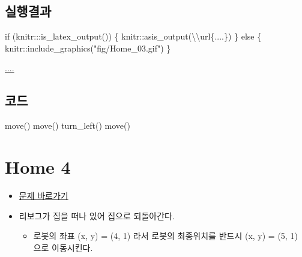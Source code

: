 \documentclass[
  b5paperpaper,
  DIV=11,
  numbers=noendperiod]{scrreprt}
\newenvironment{Shaded}{\begin{snugshade}}{\end{snugshade}}
\newcommand{\ControlFlowTok}[1]{\textcolor[rgb]{0.00,0.23,0.31}{#1}}
\newcommand{\FunctionTok}[1]{\textcolor[rgb]{0.28,0.35,0.67}{#1}}
\newcommand{\NormalTok}[1]{\textcolor[rgb]{0.00,0.23,0.31}{#1}}
\newcommand{\SpecialCharTok}[1]{\textcolor[rgb]{0.37,0.37,0.37}{#1}}
\newcommand{\StringTok}[1]{\textcolor[rgb]{0.13,0.47,0.30}{#1}}
\providecommand{\tightlist}{%
  \setlength{\itemsep}{0pt}\setlength{\parskip}{0pt}}\usepackage{longtable,booktabs,array}
\begin{document}
\hypertarget{uxc2e4uxd589uxacb0uxacfc-3}{%
\subsection{실행결과}\label{uxc2e4uxd589uxacb0uxacfc-3}}

\begin{Shaded}
\begin{Highlighting}[]
\ControlFlowTok{if}\NormalTok{ (knitr}\SpecialCharTok{:::}\FunctionTok{is\_latex\_output}\NormalTok{()) \{}
\NormalTok{  knitr}\SpecialCharTok{::}\FunctionTok{asis\_output}\NormalTok{(}\StringTok{\textquotesingle{}}\SpecialCharTok{\textbackslash{}\textbackslash{}}\StringTok{url\{....\}\textquotesingle{}}\NormalTok{)}
\NormalTok{\} }\ControlFlowTok{else}\NormalTok{ \{}
\NormalTok{  knitr}\SpecialCharTok{::}\FunctionTok{include\_graphics}\NormalTok{(}\StringTok{"fig/Home\_03.gif"}\NormalTok{)}
\NormalTok{\}}
\end{Highlighting}
\end{Shaded}

\url{....}

\hypertarget{uxcf54uxb4dc-3}{%
\subsection{코드}\label{uxcf54uxb4dc-3}}

\begin{Shaded}
\begin{Highlighting}[]
\FunctionTok{move}\NormalTok{()}
\FunctionTok{move}\NormalTok{()}
\FunctionTok{turn\_left}\NormalTok{()}
\FunctionTok{move}\NormalTok{()}
\end{Highlighting}
\end{Shaded}

\hypertarget{home-04}{%
\section{Home 4}\label{home-04}}

\begin{itemize}
\tightlist
\item
  \href{https://reeborg.ca/reeborg.html?lang=ko-en\&mode=python\&menu=worlds\%2Fmenus\%2Freeborg_intro_en.json\&name=Home\%204\&url=worlds\%2Ftutorial_en\%2Fhome4.json}{문제
  바로가기}
\item
  리보그가 집을 떠나 있어 집으로 되돌아간다.

  \begin{itemize}
  \tightlist
  \item
    로봇의 좌표 (x, y) = (4, 1) 라서 로봇의 최종위치를 반드시 (x, y) =
    (5, 1) 으로 이동시킨다.
  \end{itemize}
\end{itemize}
\end{document}
